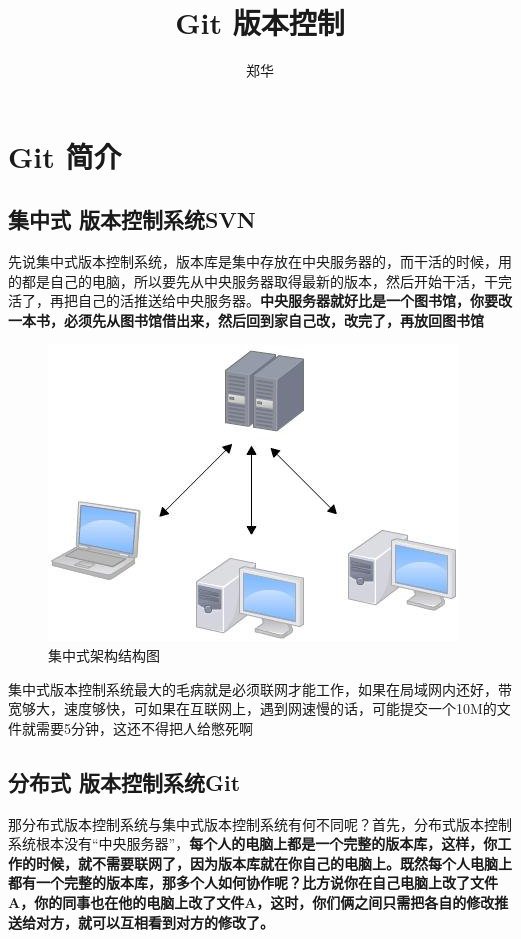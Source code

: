 \documentclass[UTF8,a4paper,12pt]{ctexbook}
\author{\kaishu 郑华}
\title{\heiti Git 版本控制}
\begin{document}
 	\maketitle
 	\tableofcontents
  \chapter{Git 简介}
	  \section{集中式 版本控制系统SVN}
		  先说集中式版本控制系统，版本库是集中存放在中央服务器的，而干活的时候，用的都是自己的电脑，所以要先从中央服务器取得最新的版本，然后开始干活，干完活了，再把自己的活推送给中央服务器。\textbf{中央服务器就好比是一个图书馆，你要改一本书，必须先从图书馆借出来，然后回到家自己改，改完了，再放回图书馆}
			  
		   \begin{figure}[h]
		   	\centering
		   	\includegraphics[scale = 0.7]{JiZhong.jpg}
		   	\caption{集中式架构结构图}
		   \end{figure}
		   
		  集中式版本控制系统最大的毛病就是必须联网才能工作，如果在局域网内还好，带宽够大，速度够快，可如果在互联网上，遇到网速慢的话，可能提交一个10M的文件就需要5分钟，这还不得把人给憋死啊
		  
	  \section{分布式 版本控制系统Git}
		  那分布式版本控制系统与集中式版本控制系统有何不同呢？首先，分布式版本控制系统根本没有“中央服务器”，\textbf{每个人的电脑上都是一个完整的版本库，这样，你工作的时候，就不需要联网了，因为版本库就在你自己的电脑上。既然每个人电脑上都有一个完整的版本库，那多个人如何协作呢？比方说你在自己电脑上改了文件A，你的同事也在他的电脑上改了文件A，这时，你们俩之间只需把各自的修改推送给对方，就可以互相看到对方的修改了。}
		  
\end{document}
